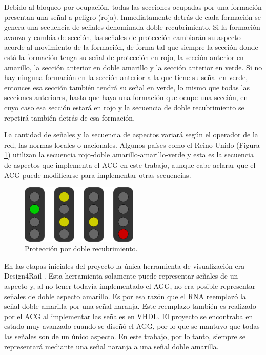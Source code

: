 	Debido al bloqueo por ocupación, todas las secciones ocupadas por una formación presentan una señal a peligro (roja). Inmediatamente detrás de cada formación se genera una secuencia de señales denominada doble recubrimiento. Si la formación avanza y cambia de sección, las señales de protección cambiarán su aspecto acorde al movimiento de la formación, de forma tal que siempre la sección donde está la formación tenga su señal de protección en rojo, la sección anterior en amarillo, la sección anterior en doble amarillo y la sección anterior en verde. Si no hay ninguna formación en la sección anterior a la que tiene su señal en verde, entonces esa sección también tendrá su señal en verde, lo mismo que todas las secciones anteriores, hasta que haya una formación que ocupe una sección, en cuyo caso esa sección estará en rojo y la secuencia de doble recubrimiento se repetirá también detrás de esa formación.
	 
	La cantidad de señales y la secuencia de aspectos variará según el operador de la red, las normas locales o nacionales. Algunos países como el Reino Unido \cite{UK} (Figura \ref{fig:uk_signalling}) utilizan la secuencia rojo-doble amarillo-amarillo-verde y esta es la secuencia de aspectos que implementa el ACG en este trabajo, aunque cabe aclarar que el ACG puede modificarse para implementar otras secuencias. 
	
	\begin{figure}[!h]
		\centering
		\includegraphics[width=0.5\textwidth]{Figuras/semaforo2}
		\centering\caption{Protección por doble recubrimiento.}
		\label{fig:uk_signalling}
	\end{figure}
	
	En las etapas iniciales del proyecto la única herramienta de visualización era Design4Rail \cite{DESIGN4RAIL}. Esta herramienta solamente puede representar señales de un aspecto y, al no tener todavía implementado el AGG, no era posible representar señales de doble aspecto amarillo. Es por esa razón que el RNA reemplazó la señal doble amarilla por una señal naranja. Este reemplazo también es realizado por el ACG al implementar las señales en VHDL. El proyecto se encontraba en estado muy avanzado cuando se diseñó el AGG, por lo que se mantuvo que todas las señales son de un único aspecto. En este trabajo, por lo tanto, siempre se representará mediante una señal naranja a una señal doble amarilla.
	
	

	
	